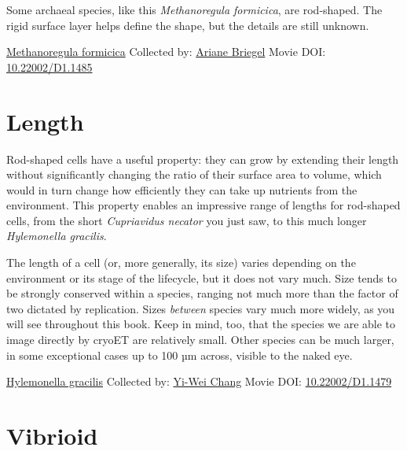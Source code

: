 \documentclass[]{tufte-book}
\begin{document}
Some archaeal species, like this \emph{Methanoregula formicica}, are rod-shaped. The rigid surface layer helps define the shape, but the details are still unknown.



\hypertarget{htmlwidget-4a45b29d3d66dbbed9c2}{}

\label{fig:3-2b}\protect\hyperlink{tree}{Methanoregula formicica} Collected by: \protect\hyperlink{ariane_briegel}{Ariane Briegel} Movie DOI: \href{https://doi.org/10.22002/D1.1485}{10.22002/D1.1485}

\hypertarget{length}{%
\section{Length}\label{length}}

Rod-shaped cells have a useful property: they can grow by extending their length without significantly changing the ratio of their surface area to volume, which would in turn change how efficiently they can take up nutrients from the environment. This property enables an impressive range of lengths for rod-shaped cells, from the short \emph{Cupriavidus necator} you just saw, to this much longer \emph{Hylemonella gracilis}.

The length of a cell (or, more generally, its size) varies depending on the environment or its stage of the lifecycle, but it does not vary much. Size tends to be strongly conserved within a species, ranging not much more than the factor of two dictated by replication. Sizes \emph{between} species vary much more widely, as you will see throughout this book. Keep in mind, too, that the species we are able to image directly by cryoET are relatively small. Other species can be much larger, in some exceptional cases up to 100 µm across, visible to the naked eye.



\hypertarget{htmlwidget-303de22b04dd20285239}{}

\label{fig:3-3}\protect\hyperlink{tree}{Hylemonella gracilis} Collected by: \protect\hyperlink{yi-wei_chang}{Yi-Wei Chang} Movie DOI: \href{https://doi.org/10.22002/D1.1479}{10.22002/D1.1479}

\hypertarget{vibrioid}{%
\section{Vibrioid}\label{vibrioid}}
\end{document}

